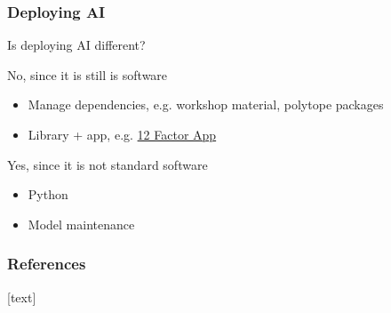 \begin{frame}
\frametitle{Deploying AI}

Is deploying AI different?\newline

No, since it is still is software
\begin{itemize}
\item Manage dependencies, e.g. workshop material, polytope packages
\item Library + app, e.g. \href{https://12factor.net}{12 Factor App}
\end{itemize}

Yes, since it is not standard software
\begin{itemize}
    \item Python
    \item Model maintenance
\end{itemize}
\end{frame}


\begin{frame}[allowframebreaks]
    \frametitle{References}
    [text]
    
    
\end{frame}
